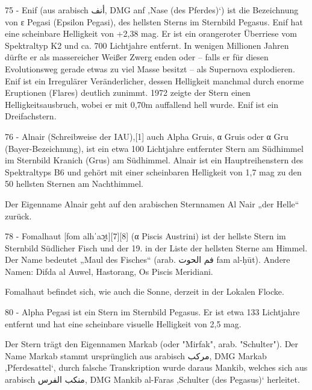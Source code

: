 75 - Enif (aus arabisch أنف, DMG anf ‚Nase (des Pferdes)‘) ist die Bezeichnung von ε Pegasi (Epsilon Pegasi), des hellsten Sterns im Sternbild Pegasus. Enif hat eine scheinbare Helligkeit von +2,38 mag. Er ist ein orangeroter Überriese vom Spektraltyp K2 und ca. 700 Lichtjahre entfernt. In wenigen Millionen Jahren dürfte er als massereicher Weißer Zwerg enden oder – falls er für diesen Evolutionsweg gerade etwas zu viel Masse besitzt – als Supernova explodieren. Enif ist ein Irregulärer Veränderlicher, dessen Helligkeit manchmal durch enorme Eruptionen (Flares) deutlich zunimmt. 1972 zeigte der Stern einen Helligkeitsausbruch, wobei er mit 0,70m auffallend hell wurde. Enif ist ein Dreifachstern. 



76 - Alnair (Schreibweise der IAU),[1] auch Alpha Gruis, α Gruis oder α Gru (Bayer-Bezeichnung), ist ein etwa 100 Lichtjahre entfernter Stern am Südhimmel im Sternbild Kranich (Grus) am Südhimmel. Alnair ist ein Hauptreihenstern des Spektraltyps B6 und gehört mit einer scheinbaren Helligkeit von 1,7 mag zu den 50 hellsten Sternen am Nachthimmel.

Der Eigenname Alnair geht auf den arabischen Sternnamen Al Nair „der Helle“ zurück. 



78 - Fomalhaut [fom alhˈaɔ̯t][7][8] (α Piscis Austrini) ist der hellste Stern im Sternbild Südlicher Fisch und der 19. in der Liste der hellsten Sterne am Himmel. Der Name bedeutet „Maul des Fisches“ (arab. فم الحوت fam al-ḥūt). Andere Namen: Difda al Auwel, Hastorang, Os Piscis Meridiani.

Fomalhaut befindet sich, wie auch die Sonne, derzeit in der Lokalen Flocke. 



80 - Alpha Pegasi ist ein Stern im Sternbild Pegasus. Er ist etwa 133 Lichtjahre entfernt und hat eine scheinbare visuelle Helligkeit von 2,5 mag.

Der Stern trägt den Eigennamen Markab (oder "Mirfak", arab. "Schulter"). Der Name Markab stammt ursprünglich aus arabisch مركب, DMG Markab ‚Pferdesattel‘, durch falsche Transkription wurde daraus Mankib, welches sich aus arabisch منكب الفرس, DMG Mankib al-Faras ‚Schulter (des Pegasus)‘ herleitet. 











